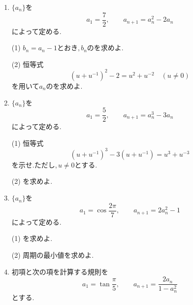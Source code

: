 \begin{enumerate}[label=\textbf{問\arabic*.},leftmargin=3.8em,format=\bookitemlink{practice-special}{problem}{answer}]
                \par\smallskip\noindent
                (2) $\displaystyle \lim_{n\to\infty}a_n$を求めよ.
          \item {}$\displaystyle \{a_n\}$を
                \[
                  a_1=\frac72,\qquad
                  a_{n+1}=a_n^2-2a_n
                \]
                によって定める.
                \par\smallskip\noindent
                (1) $\displaystyle b_n=a_n-1$とおき,\,$\displaystyle b_n$のを求めよ.
                \par\smallskip\noindent
                (2) 恒等式
                \[
                  \left(u+u^{-1}\right)^2-2=u^2+u^{-2}
                  \quad(u\ne0)
                \]
                を用いて$\displaystyle a_n$のを求めよ.
          \item {}$\displaystyle \{a_n\}$を
                \[
                  a_1=\frac52,\qquad
                  a_{n+1}=a_n^3-3a_n
                \]
                によって定める.
                \par\smallskip\noindent
                (1) 恒等式
                \[
                  \left(u+u^{-1}\right)^3
                  -3\left(u+u^{-1}\right)=u^3+u^{-3}
                \]
                を示せ.ただし,\,$\displaystyle u\ne0$とする.
                \par\smallskip\noindent
                (2) を求めよ.
          \item {}$\displaystyle \{a_n\}$を
                \[
                  a_1=\cos\frac{2\pi}{7},\qquad
                  a_{n+1}=2a_n^2-1
                \]
                によって定める.
                \par\smallskip\noindent
                (1) を求めよ.
                \par\smallskip\noindent
                (2) 周期の最小値を求めよ.
          \item 初項と次の項を計算する規則を
                \[
                  a_1=\tan\frac{\pi}{5},\qquad
                  a_{n+1}=\frac{2a_n}{1-a_n^2}
                \]
                とする.
                \par\smallskip\noindent

\end{enumerate}
